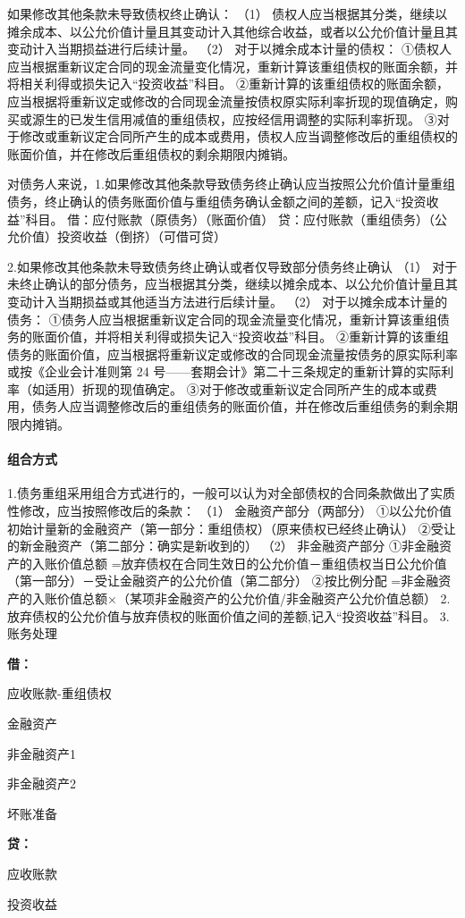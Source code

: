 \documentclass[UTF8,12pt]{ctexart}
\newenvironment{Dr}{%
	\begin{list}{}%
		{
			\setlength{\leftmargin}{2em}
			\setlength{\labelwidth}{2em}
			\setlength{\labelsep}{0pt}
			\setlength{\itemindent}{0pt}
			\setlength{\listparindent}{0pt}
			\setlength{\parsep}{0pt}
			\setlength{\topsep}{0pt}
		}
		\item[\textbf{借：}]
	}{%
	\end{list}
}
\newenvironment{Cr}{%
	\begin{list}{}%
		{
			\setlength{\leftmargin}{2em}
			\setlength{\labelwidth}{2em}
			\setlength{\labelsep}{0pt}
			\setlength{\itemindent}{0pt}
			\setlength{\listparindent}{0pt}
			\setlength{\parsep}{0pt}
			\setlength{\topsep}{0pt}
		}
		\item[\textbf{贷：}]
	}{%
	\end{list}
}
\numberwithin{equation}{section} %
\numberwithin{figure}{section}
\numberwithin{table}{section}
\begin{document}
	如果修改其他条款未导致债权终止确认：
	（1）	债权人应当根据其分类，继续以摊余成本、以公允价值计量且其变动计入其他综合收益，或者以公允价值计量且其变动计入当期损益进行后续计量。
	（2）	对于以摊余成本计量的债权：
	①债权人应当根据重新议定合同的现金流量变化情况，重新计算该重组债权的账面余额，并将相关利得或损失记入“投资收益”科目。
	②重新计算的该重组债权的账面余额，应当根据将重新议定或修改的合同现金流量按债权原实际利率折现的现值确定，购买或源生的已发生信用减值的重组债权，应按经信用调整的实际利率折现。
	③对于修改或重新议定合同所产生的成本或费用，债权人应当调整修改后的重组债权的账面价值，并在修改后重组债权的剩余期限内摊销。
	
	对债务人来说，1.如果修改其他条款导致债务终止确认应当按照公允价值计量重组债务，终止确认的债务账面价值与重组债务确认金额之间的差额，记入“投资收益”科目。
	借：应付账款（原债务）（账面价值）
	贷：应付账款（重组债务）（公允价值）投资收益（倒挤）（可借可贷）
	
	2.如果修改其他条款未导致债务终止确认或者仅导致部分债务终止确认
	（1）	对于未终止确认的部分债务，应当根据其分类，继续以摊余成本、以公允价值计量且其变动计入当期损益或其他适当方法进行后续计量。
	（2）	对于以摊余成本计量的债务：
	①债务人应当根据重新议定合同的现金流量变化情况，重新计算该重组债务的账面价值，并将相关利得或损失记入“投资收益”科目。
	②重新计算的该重组债务的账面价值，应当根据将重新议定或修改的合同现金流量按债务的原实际利率或按《企业会计准则第 24 号——套期会计》第二十三条规定的重新计算的实际利率（如适用）折现的现值确定。
	③对于修改或重新议定合同所产生的成本或费用，债务人应当调整修改后的重组债务的账面价值，并在修改后重组债务的剩余期限内摊销。
	
	\paragraph{组合方式}
	1.债务重组采用组合方式进行的，一般可以认为对全部债权的合同条款做出了实质性修改，应当按照修改后的条款：
	（1）	金融资产部分（两部分）
	①以公允价值初始计量新的金融资产（第一部分：重组债权）（原来债权已经终止确认）
	②受让的新金融资产（第二部分：确实是新收到的）
	（2）	非金融资产部分
	①非金融资产的入账价值总额
	=放弃债权在合同生效日的公允价值－重组债权当日公允价值（第一部分）－受让金融资产的公允价值（第二部分）
	②按比例分配
	=非金融资产的入账价值总额×（某项非金融资产的公允价值/非金融资产公允价值总额） 
	2.放弃债权的公允价值与放弃债权的账面价值之间的差额,记入“投资收益”科目。
	3.账务处理
	\begin{Dr}
		应收账款-重组债权
		
		金融资产
		
		非金融资产1
		
		非金融资产2
		
		坏账准备
	\end{Dr}
	\begin{Cr}
		应收账款
		
		投资收益
	\end{Cr}
	
\end{document}
